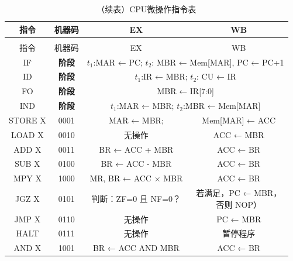 \documentclass[lang=cn,a4paper,newtx]{elegantpaper}
\begin{document}
\begin{longtable}{cccc}
  \caption{CPU微操作指令表} \label{tab:five_stage_pipeline}\\
  \toprule
  指令 & 机器码  & EX & WB \\
  \midrule
  \endfirsthead

  \toprule
  \caption[]{（续表）CPU微操作指令表} \\
  \toprule
  指令 & 机器码 & EX & WB \\
  \midrule
  \endhead

  \bottomrule
  \endlastfoot
  \rowcolor{red!10}
  IF & \textbf{阶段} & \multicolumn{2}{c}{$t_1$:MAR ← PC; $t_2$: MBR ← Mem[MAR], PC ← PC+1} \\
  \midrule
  \rowcolor{yellow!10}
  ID & \textbf{阶段} & \multicolumn{2}{c}{$t_1$:IR ← MBR; $t_2$: CU ← IR}\\
  \midrule
  \rowcolor{blue!10}
  FO & \textbf{阶段} & \multicolumn{2}{c}{MBR ← IR[7:0]} \\
  \midrule
  \rowcolor{green!10}
  
  IND & \textbf{阶段} & \multicolumn{2}{c}{$t_1$:MAR ← MBR;  $t_2$:MBR ← Mem[MAR]}\\
  \midrule
  STORE X & 0001  & MAR ← MBR; & Mem[MAR] ← ACC \\

  LOAD X & 0010 &
  无操作 & 
  ACC ← MBR \\
  \midrule
  ADD X & 0011 &
  
  BR ← ACC + MBR & 
  ACC ← BR \\

  SUB X & 0100 &
  
  BR ← ACC - MBR & 
  ACC ← BR \\
  MPY X & 1000 &
  
  MR, BR ← ACC × MBR &
  ACC ← BR \\
  \midrule
  JGZ X & 0101 &
   
  判断：ZF=0 且 NF=0？ & 
  \makecell{若满足，PC ← MBR，\\否则 NOP）} \\

  JMP X & 0110 &
  
  无操作 & 
  PC ← MBR \\

  HALT & 0111 &
  
  无操作 & 
  暂停程序 \\

  
  \midrule
  AND X & 1001 &
  
  BR ← ACC AND MBR &
  ACC ← BR \\


\end{longtable}
\end{document}
